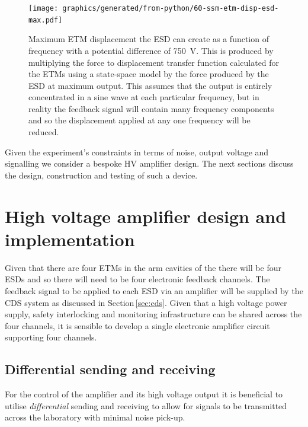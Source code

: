 \begin{figure}
  \centering
  \texttt{[image: graphics/generated/from-python/60-ssm-etm-disp-esd-max.pdf]}
  \caption[Maximum end test mass displacement the electrostatic drive can create]{\label{fig:ssm-etm-disp-esd-max}Maximum \gls{ETM} displacement the \gls{ESD} can create as a function of frequency with a potential difference of \SI{750}{\volt}. This is produced by multiplying the force to displacement transfer function calculated for the \glspl{ETM} using a state-space model by the force produced by the \gls{ESD} at maximum output. This assumes that the output is entirely concentrated in a sine wave at each particular frequency, but in reality the feedback signal will contain many frequency components and so the displacement applied at any one frequency will be reduced.}
\end{figure}

Given the experiment's constraints in terms of noise, output voltage and signalling we consider a bespoke \gls{HV} amplifier design. The next sections discuss the design, construction and testing of such a device.

\section{\label{sec:hv-amplifier}High voltage amplifier design and implementation}
Given that there are four \glspl{ETM} in the arm cavities of the \SSMEXPT{} there will be four \glspl{ESD} and so there will need to be four electronic feedback channels. The feedback signal to be applied to each \gls{ESD} via an amplifier will be supplied by the \gls{CDS} system as discussed in Section\,\ref{sec:cds}. Given that a high voltage power supply, safety interlocking and monitoring infrastructure can be shared across the four channels, it is sensible to develop a single electronic amplifier circuit supporting four channels.

\subsection{Differential sending and receiving}
For the control of the amplifier and its high voltage output it is beneficial to utilise \emph{differential} sending and receiving to allow for signals to be transmitted across the laboratory with minimal noise pick-up.

